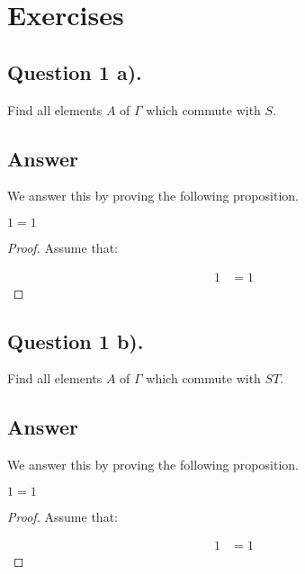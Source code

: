 \section{Exercises}


\subsection{Question 1 a).}
\noindent
Find all elements $A$ of $\Gamma$ which commute with $S$.

\subsection*{Answer}
\noindent
We answer this by proving the following proposition.

\begin{proposition}
    $1=1$
\end{proposition}

\begin{proof}
    Assume that:

    \begin{align*}
        1 &= 1
    \end{align*}

\end{proof}


\subsection{Question 1 b).}
\noindent
Find all elements $A$ of $\Gamma$ which commute with $ST$.

\subsection*{Answer}
\noindent
We answer this by proving the following proposition.

\begin{proposition}
    $1=1$
\end{proposition}

\begin{proof}
    Assume that:

    \begin{align*}
        1 &= 1
    \end{align*}

\end{proof}